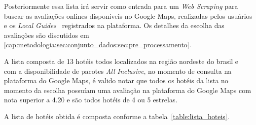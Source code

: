 Posteriormente essa lista irá servir como entrada para um \emph{Web Scraping} para buscar as avaliações onlines disponíveis no Google Maps, realizadas pelos usuários e os \emph{Local Guides}~\cite{google2022localguides} registrados na plataforma. Os detalhes da escolha das avaliações são discutidos em \ref{cap:metodologia:sec:conjunto_dados:sec:pre_processamento}.

A lista composta de 13 hotéis todos localizados na região nordeste do brasil e com a disponibilidade de pacotes \emph{All Inclusive}, no momento de consulta na plataforma do Google Maps, é valido notar que todos os hotéis da lista no momento da escolha possuíam uma avaliação na plataforma do Google Maps com nota superior a 4.20 e são todos hotéis de 4 ou 5 estrelas.

A lista de hotéis obtida é composta conforme a tabela~\ref{table:lista_hoteis}.

